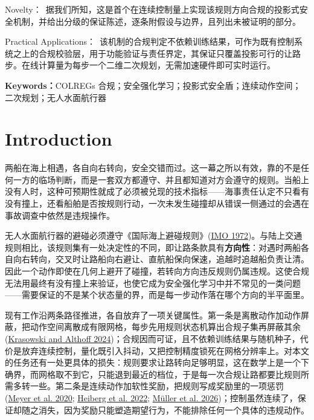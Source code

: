 \documentclass[12pt,letterpaper]{article}
\newcommand{\abshead}[1]{#1\ }
\newcommand{\citl}[2]{(\hyperlink{ref:#1}{#2})}
\newcommand{\citm}[1]{(#1)}
\newcommand{\cl}[2]{\hyperlink{ref:#1}{#2}}
\begin{document}
\abshead{Novelty：}据我们所知，这是首个在连续控制量上实现该规则方向合规的投影式安全机制，并给出分级的保证陈述，逐条附假设与边界，且列出未被证明的部分。

\abshead{Practical Applications：}该机制的合规判定不依赖训练结果，可作为既有控制系统之上的合规校验层，用于功能验证与责任界定，其保证只覆盖投影可行的让路步。在线计算量为每步一个二维二次规划，无需加速硬件即可实时运行。

\vspace{12pt}

\noindent\textbf{Keywords：}COLREGs 合规；安全强化学习；投影式安全盾；连续动作空间；二次规划；无人水面航行器

\RaggedRight

\newpage  %

\section{Introduction}

两船在海上相遇，各自向右转向，安全交错而过。这一幕之所以有效，靠的不是任何一方的临场判断，而是一套双方都遵守、并且都知道对方会遵守的规则。当船上没有人时，这种可预期性就成了必须被兑现的技术指标——海事责任认定不只看有没有撞上，还看船舶是否按规则行动，一次未发生碰撞却从错误一侧通过的会遇在事故调查中依然是违规操作。

无人水面航行器的避碰必须遵守《国际海上避碰规则》\citl{imo1972}{IMO 1972}。与陆上交通规则相比，该规则集有一处决定性的不同，即让路条款具有\textbf{方向性}：对遇时两船各自向右转向，交叉时让路船向右避让、直航船保向保速，追越时追越船负责让清。因此一个动作即使在几何上避开了碰撞，若转向方向违反规则仍属违规。这使合规无法用最终有没有撞上来验证，也使它成为安全强化学习中并不常见的一类问题——需要保证的不是某个状态量的界，而是每一步动作落在哪个方向的半平面里。

现有工作沿两条路径推进，各自放弃了一项关键属性。第一条是离散动作加动作屏蔽，把动作空间离散成有限网格，每步先用规则状态机算出合规子集再屏蔽其余 \citl{krasowski2024}{Krasowski and Althoff 2024}；合规因而可证，且不依赖训练结果与随机种子，代价是放弃连续控制，量化既引入抖动，又把控制精度锁死在网格分辨率上。对本文的任务还有一处更具体的损失：规则要求让路转向足够明显，这在数学上是一个下确界，而网格取不到它，只能退到最近的档位，于是每一次合规让路都要比规则所需多转一些。第二条是连续动作加软性奖励，把规则写成奖励里的一项惩罚 \citm{\cl{meyer2020}{Meyer et al. 2020}; \cl{heiberg2022}{Heiberg et al. 2022}; \cl{mller2026}{Müller et al. 2026}}；控制虽然连续了，保证却随之消失，因为奖励只能塑造期望行为，不能排除任何一个具体的违规动作。
\end{document}
